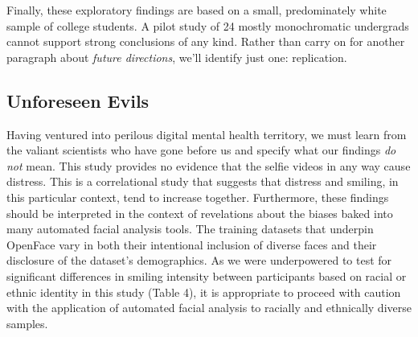 \documentclass[authordate, empirical]{jote-new-article}
\begin{document}
Finally, these exploratory findings are based on a small, predominately white sample of college students. A pilot study of 24 mostly monochromatic undergrads cannot support strong conclusions of any kind. Rather than carry on for another paragraph about \emph{future directions}, we'll identify just one: replication.







\subsection{Unforeseen Evils}



Having ventured into perilous digital mental health territory, we must learn from the valiant scientists who have gone before us and specify what our findings \emph{do not} mean. This study provides no evidence that the selfie videos in any way cause distress. This is a correlational study that suggests that distress and smiling, in this particular context, tend to increase together. Furthermore, these findings should be interpreted in the context of revelations about the biases baked into many automated facial analysis tools. The training datasets that underpin OpenFace vary in both their intentional inclusion of diverse faces and their disclosure of the dataset's demographics. As we were underpowered to test for significant differences in smiling intensity between participants based on racial or ethnic identity in this study (Table 4), it is appropriate to proceed with caution with the application of automated facial analysis to racially and ethnically diverse samples.
\end{document}
